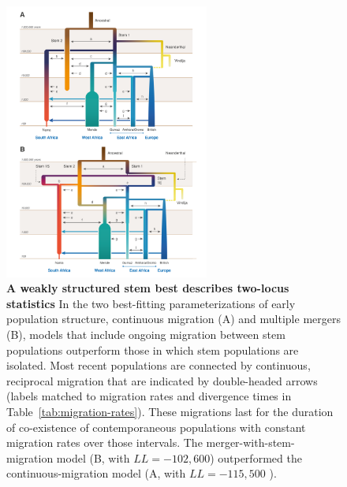 \documentclass[]{article}
\begin{document}
\begin{figure}[t!]
    \centering
    \includegraphics[width=0.6\textwidth]{figures/fig2-melisa}
    \caption{
        \textbf{A weakly structured stem best describes two-locus statistics}
        In the two best-fitting parameterizations of early population structure,
        continuous migration (A) and multiple mergers (B), models
        that include ongoing migration between stem populations outperform
        those in which stem populations are isolated. Most recent populations are
        connected by continuous, reciprocal migration that are indicated by 
        double-headed arrows (labels matched to migration rates and divergence
        times in Table~\ref{tab:migration-rates}). These migrations last for the
        duration of co-existence of contemporaneous populations with constant
        migration rates over those intervals. The
        merger-with-stem-migration model (B, with  $LL=-102,600$) outperformed the
        continuous-migration model (A, with $LL=-115,500$ ).
    }
    \label{fig:2}
\end{figure}
\end{document}
